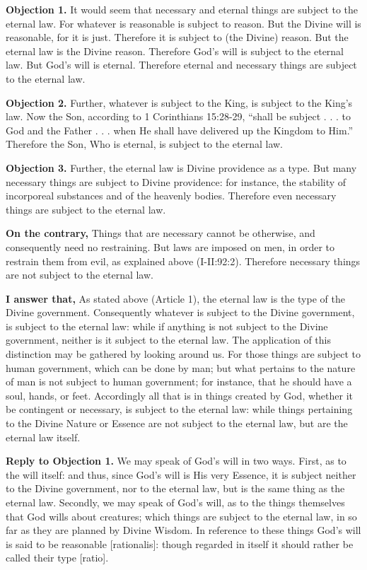 
\textbf{Objection 1.} It would seem that necessary and eternal things are subject to the eternal law. For whatever is reasonable is subject to reason. But the Divine will is reasonable, for it is just. Therefore it is subject to (the Divine) reason. But the eternal law is the Divine reason. Therefore God's will is subject to the eternal law. But God's will is eternal. Therefore eternal and necessary things are subject to the eternal law.

\textbf{Objection 2.} Further, whatever is subject to the King, is subject to the King's law. Now the Son, according to 1 Corinthians 15:28-29, ``shall be subject . . . to God and the Father . . . when He shall have delivered up the Kingdom to Him.'' Therefore the Son, Who is eternal, is subject to the eternal law.

\textbf{Objection 3.} Further, the eternal law is Divine providence as a type. But many necessary things are subject to Divine providence: for instance, the stability of incorporeal substances and of the heavenly bodies. Therefore even necessary things are subject to the eternal law.

\textbf{On the contrary,} Things that are necessary cannot be otherwise, and consequently need no restraining. But laws are imposed on men, in order to restrain them from evil, as explained above (I-II:92:2). Therefore necessary things are not subject to the eternal law.

\textbf{I answer that,} As stated above (Article 1), the eternal law is the type of the Divine government. Consequently whatever is subject to the Divine government, is subject to the eternal law: while if anything is not subject to the Divine government, neither is it subject to the eternal law. The application of this distinction may be gathered by looking around us. For those things are subject to human government, which can be done by man; but what pertains to the nature of man is not subject to human government; for instance, that he should have a soul, hands, or feet. Accordingly all that is in things created by God, whether it be contingent or necessary, is subject to the eternal law: while things pertaining to the Divine Nature or Essence are not subject to the eternal law, but are the eternal law itself.

\textbf{Reply to Objection 1.} We may speak of God's will in two ways. First, as to the will itself: and thus, since God's will is His very Essence, it is subject neither to the Divine government, nor to the eternal law, but is the same thing as the eternal law. Secondly, we may speak of God's will, as to the things themselves that God wills about creatures; which things are subject to the eternal law, in so far as they are planned by Divine Wisdom. In reference to these things God's will is said to be reasonable [rationalis]: though regarded in itself it should rather be called their type [ratio].

